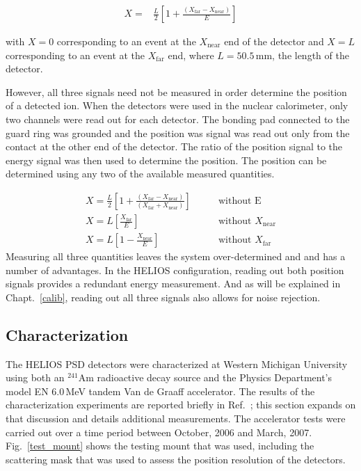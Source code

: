 \begin{equation}
\begin{split}
X=&\frac{L}{2}\left[1+\frac{(X_\mathrm{far}-X_\mathrm{near})}{E}\right]
\label{detector_X}
\end{split}
\end{equation}

with $X=0$ corresponding to an event at the $X_\mathrm{near}$ end of the detector and $X=L$ corresponding to an event at the $X_\mathrm{far}$ end, where $L=50.5$\,mm, the length of the detector.

However, all three signals need not be measured in order determine the position of a detected ion.  When the detectors were used in the nuclear calorimeter, only two channels were read out for each detector.  The bonding pad connected to the guard ring was grounded and the position was signal was read out only from the contact at the other end of the detector.  The ratio of the position signal to the energy signal was then used to determine the position. %
The position can be determined using any two of the available measured quantities.

\begin{subequations}
\label{detector_redund}
\begin{eqnarray}
X=\frac{L}{2}\left[1+\frac{(X_\mathrm{far}-X_\mathrm{near})}{(X_\mathrm{far}+X_\mathrm{near})}\right]\qquad& \textrm{without E}\label{x_noE}\\
X=L\left[\frac{X_\mathrm{far}}{E}\right]\qquad& \textrm{without }X_\mathrm{near}\label{x_noXN}\\
X=L\left[1-\frac{X_\mathrm{near}}{E}\right]\qquad& \textrm{without }X_\mathrm{far}\label{x_noXF}
\end{eqnarray}
\end{subequations}
Measuring all three quantities leaves the system over-determined and and has a number of advantages.  In the HELIOS configuration, reading out both position signals provides a redundant energy measurement.  And as will be explained in Chapt.~\ref{calib}, reading out all three signals also allows for noise rejection. 

\subsection{Characterization}
\label{charact}
The HELIOS PSD detectors were characterized at Western Michigan University using both an $^{241}$Am radioactive decay source and the Physics Department's model EN 6.0\,MeV tandem Van de Graaff accelerator.  The results of the characterization experiments are reported briefly in Ref.~\cite{Lighthall_2010}; this section expands on that discussion and details additional measurements.  The accelerator tests were carried out over a time period between October, 2006 and March, 2007.  Fig.~\ref{test_mount} shows the testing mount that was used, including the scattering mask that was used to assess the position resolution of the detectors.

